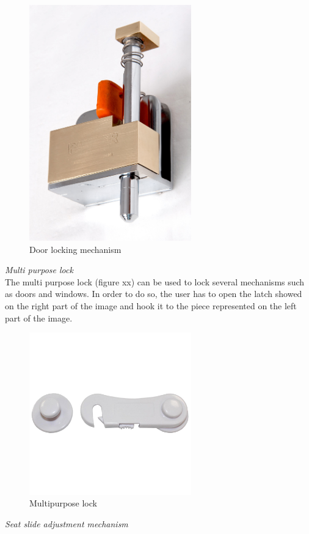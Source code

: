 \begin{figure}[h]
\centering
\includegraphics[width=7cm]{brazil_images/image043.png}
\caption{Door locking mechanism}
\label{fig:door_locking}
\end{figure}

\noindent\emph{Multi purpose lock}\\
The multi purpose lock (figure xx) can be used to lock several mechanisms such as doors and windows. In order to do so, the user has to open the latch showed on the right part of the image and hook it to the piece represented on the left part of the image.\\

\begin{figure}[h]
\centering
\includegraphics[width=7cm]{brazil_images/image044.png}
\caption{Multipurpose lock}
\label{fig:lock}
\end{figure}


\noindent\emph{Seat slide adjustment mechanism}\\

